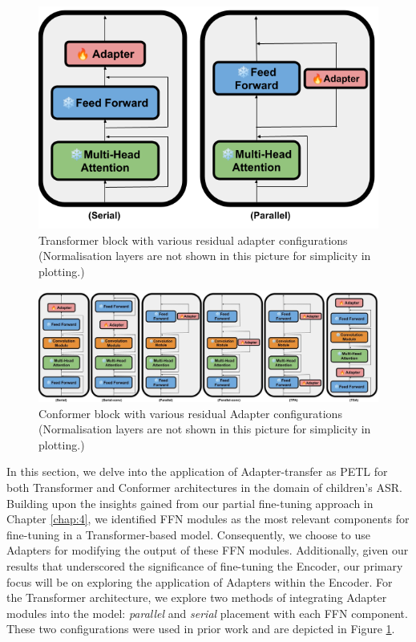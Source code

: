 \begin{figure}[t]
    \begin{center}
    \includegraphics[scale=0.27]{imgs/Adapter_Transformer.png}
    \caption{Transformer block with various residual adapter configurations (Normalisation layers are not shown in this picture for simplicity in plotting.)
    }
    \label{fig:transformer_config}
    \end{center}
\end{figure}
\begin{figure}[t]
    \begin{center}
    \includegraphics[scale=0.27]{imgs/Adapter_conformer.png}
    \caption{Conformer block with various residual Adapter configurations  (Normalisation layers are not shown in this picture for simplicity in plotting.)
    }
    \label{fig:conformer_config}
    \end{center}
\end{figure}

In this section, we delve into the application of Adapter-transfer as \ac{PETL} for both Transformer and Conformer architectures in the domain of children's \ac{ASR}. Building upon the insights gained from our partial fine-tuning approach in Chapter \ref{chap:4}, we identified \ac{FFN} modules as the most relevant components for fine-tuning in a Transformer-based model. Consequently, we choose to use Adapters for modifying the output of these \ac{FFN} modules. Additionally, given our results that underscored the significance of fine-tuning the Encoder, our primary focus will be on exploring the application of Adapters within the Encoder. For the Transformer architecture, we explore two methods of integrating Adapter modules into the model: \textit{parallel} and \textit{serial} placement with each \ac{FFN} component. These two configurations were used in prior work \cite{he2022towards} and are depicted in Figure \ref{fig:transformer_config}.

